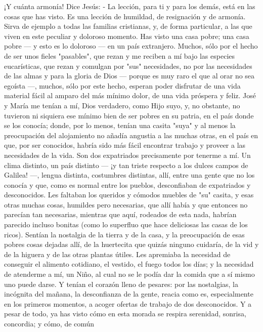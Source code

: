 \documentclass[12pt]{book} %
\begin{document}
¡Y cuánta armonía! 
Dice Jesús:                           
- La lección, para ti y para los demás, está en las cosas que has visto. Es una lección de humildad, de resignación y de 
armonía. Sirva de ejemplo a todas las familias cristianas, y, de forma particular, a las que viven en este peculiar y doloroso momento. 
Has visto una casa pobre; una casa pobre — y esto es lo doloroso — en un país extranjero. 
Muchos, sólo por el hecho de ser unos fieles "pasables", que rezan y me reciben a mí bajo las especies eucarísticas, que rezan y comulgan por "sus" necesidades, no por las necesidades de las almas y para la gloria de Dios — porque es muy raro el que al orar no sea egoísta —, muchos, sólo por este hecho, esperan poder disfrutar de una vida material fácil al amparo del más mínimo dolor, de una vida próspera y feliz. 
José y María me tenían a mí, Dios verdadero, como Hijo suyo, y, no obstante, no tuvieron ni siquiera ese mínimo bien de ser pobres  en su patria, en el país donde se los conocía; donde, por lo menos, tenían una casita "suya" y al menos la preocupación del alojamiento no añadía angustia a las muchas otras, en el país en que, por ser conocidos, habría sido más fácil encontrar trabajo y proveer a las necesidades de la vida. Son dos expatriados precisamente por tenerme a mí. Un clima distinto, un país distinto — ¡y tan triste respecto a los dulces campos de Galilea! —, lengua distinta, costumbres distintas, allí, entre una gente que no los conocía y que, como es normal entre los pueblos, desconfiaban de expatriados y desconocidos.      
Les faltaban los queridos y cómodos muebles de "su" casita, y esas otras muchas cosas, humildes pero necesarias, que 
allí había y que entonces no parecían tan necesarias, mientras que aquí, rodeados de esta nada, habrían parecido incluso bonitas (como lo superfluo que hace deliciosas las casas de los ricos). Sentían la nostalgia de la tierra y de la casa, y la preocupación de esas pobres cosas dejadas allí, de la huertecita que quizás ninguno cuidaría, de la vid y de la higuera y de las otras plantas útiles. Les apremiaba la necesidad de conseguir el alimento cotidiano, el vestido, el fuego todos los días; y la necesidad de atenderme a mí, un Niño, al cual no se le podía dar la comida que a sí mismo uno puede darse. Y tenían el corazón lleno de pesares: por las nostalgias, la incógnita del mañana, la desconfianza de la gente, reacia como es, especialmente en los primeros momentos, a acoger ofertas de trabajo de dos desconocidos. 
Y a pesar de todo, ya has visto cómo en esta morada se respira serenidad, sonrisa, concordia; y cómo, de común 
\end{document}

